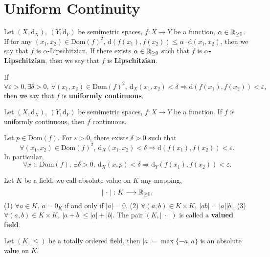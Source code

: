 \section{Uniform Continuity}
\begin{definitionenv}
    Let $(X, \mathrm{d}_X),\ (Y,\mathrm{d}_Y)$ be semimetric spaces, $f:X\longrightarrow Y$ be a function, $\alpha \in \mathbb{R}_{\ge0}$. If for any $(x_1,x_2)\in \mathrm{Dom}(f)^2$, $\mathrm{d}\left(f(x_1),f(x_2)\right)\le \alpha\cdot \mathrm{d}(x_1,x_2)$, then we say that $f$ is $\alpha$-Lipschitzian. If there exists $\alpha\in \mathbb{R}_{\ge 0}$ such that $f$ is \textbf{$\alpha$-Lipschitzian}, then we say that $f$ is \textbf{Lipschitzian}. 

    If 
    $$\forall \varepsilon>0,\exists \delta>0,\ \forall (x_1,x_2)\in \mathrm{Dom}(f)^2,\ \mathrm{d}_X(x_1,x_2)<\delta\Rightarrow \mathrm{d}(f(x_1),f(x_2))<\varepsilon,$$
    then we say that $f$ is \textbf{uniformly continuous}.
\end{definitionenv}
\begin{propositionenv}
    Let $(X,\mathrm{d}_X),\ (Y,\mathrm{d}_Y)$ be semimetric spaces, $f:X\longrightarrow Y$ be a function. If $f$ is uniformly continuous, then $f$ continuous.
\end{propositionenv}
\begin{proofenv}
Let $p\in \mathrm{Dom}(f)$. For $\varepsilon>0$, there exists $\delta>0$ such that 
$$\forall (x_1,x_2)\in \mathrm{Dom}(f)^2,\ \mathrm{d}_X(x_1,x_2)<\delta\Rightarrow \mathrm{d}(f(x_1),f(x_2))<\varepsilon.$$
In particular, 
$$\forall x\in \mathrm{Dom}(f),\ \exists \delta>0,\ \mathrm{d}_X(x,p)<\delta\Rightarrow \mathrm{d}_Y(f(x_1),f(x_2))<\varepsilon.$$
\end{proofenv}
\begin{definitionenv}
    Let $K$ be a field, we call absolute value on $K$ any mapping,
    $$\left|\ \cdot\ \right|: K\longrightarrow \mathbb{R}_{\ge 0},$$
    (1) $\forall a\in K,\ a=0_K$ if and only if $\left|a\right|=0.$
    \newline
    (2) $\forall (a,b)\in K\times K,\ \left|ab\right|=\left|a\right|\left|b\right|.$
    \newline
    (3) $\forall (a,b)\in K\times K,\ \left|a+b\right|\le \left|a\right|+\left|b\right|.$
    \newline
    The pair $(K,\left|\ \cdot\ \right|)$ is called a \textbf{valued field}.

\end{definitionenv}
\begin{exampleenv}
    Let $(K,\le)$ be a totally ordered field, then $\left|a\right|=\max\{-a,a\}$ is an absolute value on $K$.
\end{exampleenv}
